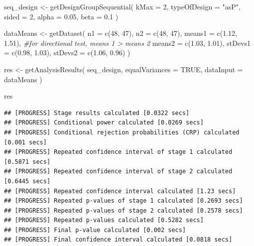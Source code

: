 \documentclass[
  oneside]{book}
\newenvironment{Shaded}{\begin{snugshade}}{\end{snugshade}}
\newcommand{\AttributeTok}[1]{\textcolor[rgb]{0.77,0.63,0.00}{#1}}
\newcommand{\CommentTok}[1]{\textcolor[rgb]{0.56,0.35,0.01}{\textit{#1}}}
\newcommand{\ConstantTok}[1]{\textcolor[rgb]{0.00,0.00,0.00}{#1}}
\newcommand{\DecValTok}[1]{\textcolor[rgb]{0.00,0.00,0.81}{#1}}
\newcommand{\FloatTok}[1]{\textcolor[rgb]{0.00,0.00,0.81}{#1}}
\newcommand{\FunctionTok}[1]{\textcolor[rgb]{0.00,0.00,0.00}{#1}}
\newcommand{\NormalTok}[1]{#1}
\newcommand{\OtherTok}[1]{\textcolor[rgb]{0.56,0.35,0.01}{#1}}
\newcommand{\StringTok}[1]{\textcolor[rgb]{0.31,0.60,0.02}{#1}}
\begin{document}
\begin{Shaded}
\begin{Highlighting}[]
\NormalTok{seq\_design }\OtherTok{\textless{}{-}} \FunctionTok{getDesignGroupSequential}\NormalTok{(}
  \AttributeTok{kMax =} \DecValTok{2}\NormalTok{,}
  \AttributeTok{typeOfDesign =} \StringTok{"asP"}\NormalTok{,}
  \AttributeTok{sided =} \DecValTok{2}\NormalTok{,}
  \AttributeTok{alpha =} \FloatTok{0.05}\NormalTok{,}
  \AttributeTok{beta =} \FloatTok{0.1}
\NormalTok{)}

\NormalTok{dataMeans }\OtherTok{\textless{}{-}} \FunctionTok{getDataset}\NormalTok{(}
  \AttributeTok{n1 =} \FunctionTok{c}\NormalTok{(}\DecValTok{48}\NormalTok{, }\DecValTok{47}\NormalTok{), }
  \AttributeTok{n2 =} \FunctionTok{c}\NormalTok{(}\DecValTok{48}\NormalTok{, }\DecValTok{47}\NormalTok{), }
  \AttributeTok{means1 =} \FunctionTok{c}\NormalTok{(}\FloatTok{1.12}\NormalTok{, }\FloatTok{1.51}\NormalTok{), }\CommentTok{\#for directional test, means 1 \textgreater{} means 2}
  \AttributeTok{means2 =} \FunctionTok{c}\NormalTok{(}\FloatTok{1.03}\NormalTok{, }\FloatTok{1.01}\NormalTok{),}
  \AttributeTok{stDevs1 =} \FunctionTok{c}\NormalTok{(}\FloatTok{0.98}\NormalTok{, }\FloatTok{1.03}\NormalTok{), }
  \AttributeTok{stDevs2 =} \FunctionTok{c}\NormalTok{(}\FloatTok{1.06}\NormalTok{, }\FloatTok{0.96}\NormalTok{)}
\NormalTok{  )}

\NormalTok{res }\OtherTok{\textless{}{-}} \FunctionTok{getAnalysisResults}\NormalTok{(}
\NormalTok{  seq\_design, }
  \AttributeTok{equalVariances =} \ConstantTok{TRUE}\NormalTok{,}
  \AttributeTok{dataInput =}\NormalTok{ dataMeans}
\NormalTok{  )}

\NormalTok{res}
\end{Highlighting}
\end{Shaded}

\begin{verbatim}
## [PROGRESS] Stage results calculated [0.0322 secs] 
## [PROGRESS] Conditional power calculated [0.0269 secs] 
## [PROGRESS] Conditional rejection probabilities (CRP) calculated [0.001 secs] 
## [PROGRESS] Repeated confidence interval of stage 1 calculated [0.5871 secs] 
## [PROGRESS] Repeated confidence interval of stage 2 calculated [0.6445 secs] 
## [PROGRESS] Repeated confidence interval calculated [1.23 secs] 
## [PROGRESS] Repeated p-values of stage 1 calculated [0.2693 secs] 
## [PROGRESS] Repeated p-values of stage 2 calculated [0.2578 secs] 
## [PROGRESS] Repeated p-values calculated [0.5282 secs] 
## [PROGRESS] Final p-value calculated [0.002 secs] 
## [PROGRESS] Final confidence interval calculated [0.0818 secs]
\end{verbatim}
\end{document}
